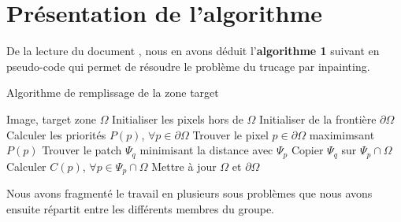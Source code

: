 \documentclass[12pt]{article}
\begin{document}






\newpage
\section{Présentation de l'algorithme}



De la lecture du document \cite{criminisi2004region}, nous en avons déduit l'\textbf{algorithme 1} suivant en pseudo-code  qui permet de résoudre le problème du trucage par inpainting.

\begin{algorithm}
    \caption{Algorithme de remplissage de la zone target}\label{alg:cap}
    \begin{algorithmic}
        \Require Image, target zone $\Omega$
        \State Initialiser les pixels hors de $\Omega$
        \State Initialiser de la frontière $\partial \Omega$
        \While{$\partial \Omega\neq\emptyset$}
            \State Calculer les priorités $P(p)$, $\forall p \in \partial \Omega$
            \State Trouver le pixel $ p \in \partial \Omega$ maximimsant $P(p)$
            \State Trouver le patch $\Psi_{q}$ minimisant la distance avec $\Psi_{p}$
            \State Copier $\Psi_{q}$ sur $\Psi_{p} \cap \Omega$
            \State Calculer $C(p)$, $\forall p \in \Psi_{p} \cap \Omega $
            \State Mettre à jour $\Omega$ et $\partial \Omega $
        \EndWhile
    \end{algorithmic}
\end{algorithm}



\vspace{0.3cm}

Nous avons fragmenté le travail en plusieurs sous problèmes que nous avons ensuite répartit entre les différents membres du groupe.
\end{document}
